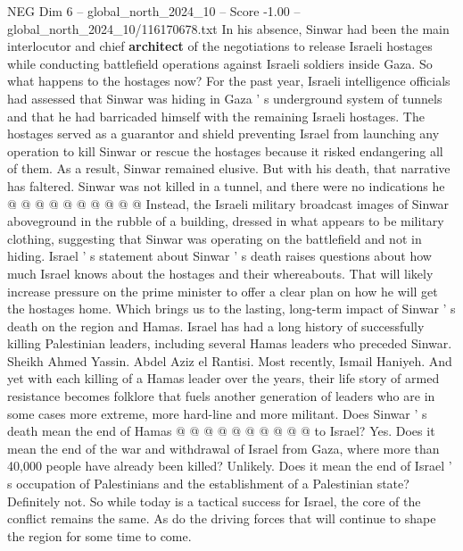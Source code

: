 \begin{textsample}{NEG Dim 6 – global\_north\_2024\_10 – Score -1.00 – global\_north\_2024\_10/116170678.txt}
In his absence, Sinwar had been the main interlocutor and chief \textbf{architect} of the negotiations to release Israeli hostages while conducting battlefield operations against Israeli soldiers inside Gaza.
So what happens to the hostages now?
For the past year, Israeli intelligence officials had assessed that Sinwar was hiding in Gaza ' s underground system of tunnels and that he had barricaded himself with the remaining Israeli hostages.
The hostages served as a guarantor and shield preventing Israel from launching any operation to kill Sinwar or rescue the hostages because it risked endangering all of them.
As a result, Sinwar remained elusive.
But with his death, that narrative has faltered.
Sinwar was not killed in a tunnel, and there were no indications he @ @ @ @ @ @ @ @ @ @ Instead, the Israeli military broadcast images of Sinwar aboveground in the rubble of a building, dressed in what appears to be military clothing, suggesting that Sinwar was operating on the battlefield and not in hiding.
Israel ' s statement about Sinwar ' s death raises questions about how much Israel knows about the hostages and their whereabouts.
That will likely increase pressure on the prime minister to offer a clear plan on how he will get the hostages home.
Which brings us to the lasting, long-term impact of Sinwar ' s death on the region and Hamas.
Israel has had a long history of successfully killing Palestinian leaders, including several Hamas leaders who preceded Sinwar.
Sheikh Ahmed Yassin.
Abdel Aziz el Rantisi.
Most recently, Ismail Haniyeh.
And yet with each killing of a Hamas leader over the years, their life story of armed resistance becomes folklore that fuels another generation of leaders who are in some cases more extreme, more hard-line and more militant.
Does Sinwar ' s death mean the end of Hamas @ @ @ @ @ @ @ @ @ @ to Israel?
Yes.
Does it mean the end of the war and withdrawal of Israel from Gaza, where more than 40,000 people have already been killed?
Unlikely.
Does it mean the end of Israel ' s occupation of Palestinians and the establishment of a Palestinian state?
Definitely not.
So while today is a tactical success for Israel, the core of the conflict remains the same.
As do the driving forces that will continue to shape the region for some time to come.

\end{textsample}
